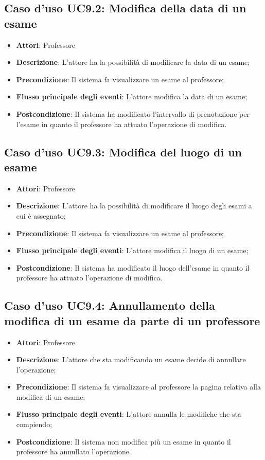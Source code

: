 \subsection{Caso d'uso \texorpdfstring{UC9.2}{UC9.2}: Modifica della data di un esame}
\begin{itemize}
\item \textbf{Attori}: Professore
\item \textbf{Descrizione}: L'attore ha la possibilità di modificare la data di un esame;
\item \textbf{Precondizione}: Il sistema fa visualizzare un esame al professore;

\item \textbf{Flusso principale degli eventi}: L'attore modifica la data di un esame;
\item \textbf{Postcondizione}: Il sistema ha modificato l'intervallo di prenotazione per l’esame in quanto il professore ha attuato l'operazione di modifica.

\end{itemize}
\subsection{Caso d'uso \texorpdfstring{UC9.3}{UC9.3}: Modifica del luogo di un esame}
\begin{itemize}
\item \textbf{Attori}: Professore
\item \textbf{Descrizione}: L'attore ha la possibilità di modificare il luogo degli esami a cui è assegnato;
\item \textbf{Precondizione}: Il sistema fa visualizzare un esame al professore;

\item \textbf{Flusso principale degli eventi}: L'attore modifica il luogo di un esame;
\item \textbf{Postcondizione}: Il sistema ha modificato il luogo dell'esame in quanto il professore ha attuato l'operazione di modifica.

\end{itemize}
\subsection{Caso d'uso \texorpdfstring{UC9.4}{UC9.4}: Annullamento della modifica di un esame da parte di un professore}
\begin{itemize}
\item \textbf{Attori}: Professore
\item \textbf{Descrizione}: L'attore che sta modificando un esame decide di annullare l'operazione;
\item \textbf{Precondizione}: Il sistema fa visualizzare al professore la pagina relativa alla modifica di un esame;

\item \textbf{Flusso principale degli eventi}: L'attore annulla le modifiche che sta compiendo;
\item \textbf{Postcondizione}: Il sistema non modifica più un esame in quanto il professore ha annullato l'operazione.

\end{itemize}
